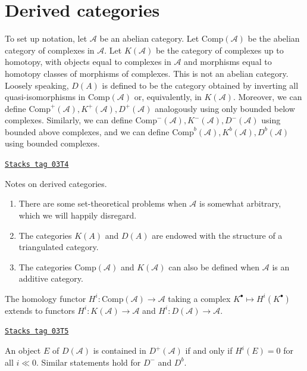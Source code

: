 \section{Derived categories}
\label{trace-section-derived-categories}
To set up notation, let $\mathcal{A}$ be an abelian category. Let
$\text{Comp}(\mathcal{A})$ be the abelian category of complexes in
$\mathcal{A}$. Let $K(\mathcal{A})$ be the category of complexes up to
homotopy, with objects equal to complexes in $\mathcal{A}$ and morphisms
equal to
homotopy classes of morphisms of complexes. This is not an abelian category.
Loosely speaking, $D(A)$ is defined to be the category obtained by inverting
all quasi-isomorphisms in $\text{Comp}(\mathcal{A})$ or, equivalently, in
$K(\mathcal{A})$. Moreover, we can define $\text{Comp}^+(\mathcal{A}),
K^+(\mathcal{A}), D^+(\mathcal{A})$ analogously using only bounded below
complexes. Similarly, we can define $\text{Comp}^-(\mathcal{A}),
K^-(\mathcal{A}), D^-(\mathcal{A})$ using bounded above complexes, and we can
define $\text{Comp}^b(\mathcal{A}), K^b(\mathcal{A}), D^b(\mathcal{A})$ using
bounded complexes.

\begin{remark}
\label{remarks-derived-categories}
\href{https://stacks.math.columbia.edu/tag/03T4}{\texttt{Stacks tag 03T4}}

Notes on derived categories.
\begin{enumerate}
\item
There are some set-theoretical problems when $\mathcal{A}$ is somewhat
arbitrary, which we will happily disregard.
\item
The categories $K(A)$ and $D(A)$ are endowed with the structure of a
triangulated category.
\item
The categories $\text{Comp}(\mathcal{A})$ and $K(\mathcal{A})$ can also be
defined when $\mathcal{A}$ is an additive category.
\end{enumerate}
\end{remark}

The homology functor $H^i : \text{Comp}(\mathcal{A}) \to \mathcal{A}$ taking a
complex $K^\bullet \mapsto H^i(K^\bullet)$ extends to functors $H^i :
K(\mathcal{A}) \to \mathcal{A}$ and $H^i : D(\mathcal{A}) \to \mathcal{A}$.

\begin{lemma}
\label{trace-lemma-when-in-bounded}
\href{https://stacks.math.columbia.edu/tag/03T5}{\texttt{Stacks tag 03T5}}

An object $E$ of $D(\mathcal{A})$ is contained in $D^+(\mathcal{A})$ if and
only if $H^i(E) =0 $ for all $i \ll 0$. Similar statements hold for $D^-$ and
$D^b$.
\end{lemma}

